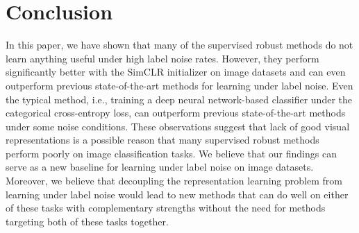 \documentclass[final]{cvpr}
\begin{document}
 \vspace{-0.1cm}
\section{Conclusion}
\vspace{-0.1cm}
In this paper, we have shown that many of the supervised robust methods do not learn anything useful under high label noise rates. 
However, they perform significantly better with the SimCLR initializer on image datasets and can even outperform previous state-of-the-art methods for learning under label noise.
Even the typical method, i.e., training a deep neural network-based classifier under the categorical cross-entropy loss, can outperform previous state-of-the-art methods under some noise conditions. 
These observations suggest that lack of good visual representations is a possible reason that many supervised robust methods perform poorly on image classification tasks. 
We believe that our findings can serve as a new baseline for learning under label noise on image datasets. 
Moreover, we believe that decoupling the representation learning problem from learning under label noise would lead to new methods that can do well on either of these tasks with complementary strengths without the need for methods targeting both of these tasks together.  




{\small


}
\end{document}
